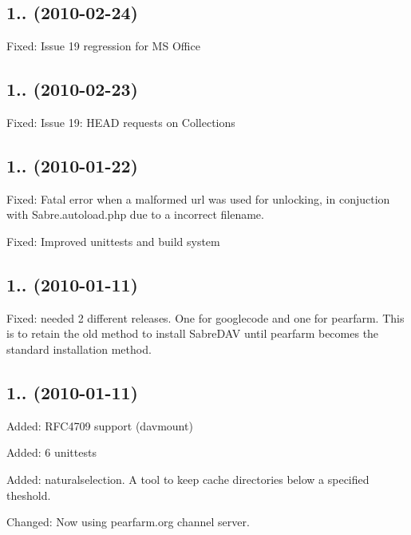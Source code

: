 \subsection*{1.. (2010-\/02-\/24) }


\begin{DoxyItemize}
\item Fixed\+: Issue 19 regression for MS Office
\end{DoxyItemize}

\subsection*{1.. (2010-\/02-\/23) }


\begin{DoxyItemize}
\item Fixed\+: Issue 19\+: H\+E\+AD requests on Collections
\end{DoxyItemize}

\subsection*{1.. (2010-\/01-\/22) }


\begin{DoxyItemize}
\item Fixed\+: Fatal error when a malformed url was used for unlocking, in conjuction with Sabre.\+autoload.\+php due to a incorrect filename.
\item Fixed\+: Improved unittests and build system
\end{DoxyItemize}

\subsection*{1.. (2010-\/01-\/11) }


\begin{DoxyItemize}
\item Fixed\+: needed 2 different releases. One for googlecode and one for pearfarm. This is to retain the old method to install Sabre\+D\+AV until pearfarm becomes the standard installation method.
\end{DoxyItemize}

\subsection*{1.. (2010-\/01-\/11) }


\begin{DoxyItemize}
\item Added\+: R\+F\+C4709 support (davmount)
\item Added\+: 6 unittests
\item Added\+: naturalselection. A tool to keep cache directories below a specified theshold.
\item Changed\+: Now using pearfarm.\+org channel server.
\end{DoxyItemize}


